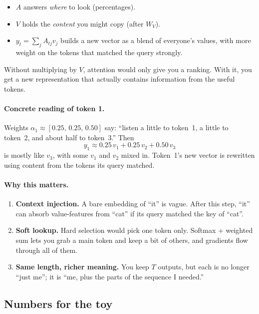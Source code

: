\documentclass[11pt]{article}
\begin{document}
\begin{itemize}[leftmargin=*]
  \item \(A\) answers \emph{where} to look (percentages).
  \item \(V\) holds the \emph{content} you might copy (after \(W_V\)).
  \item \(y_t = \sum_j A_{tj} v_j\) builds a new vector as a blend of
        everyone's values, with more weight on the tokens that matched
        the query strongly.
\end{itemize}

Without multiplying by \(V\), attention would only give you a ranking.
With it, you get a new representation that actually contains information
from the useful tokens.

\paragraph{Concrete reading of token 1.}
Weights \(\alpha_1 \approx [0.25,\,0.25,\,0.50]\) say:
``listen a little to token~1, a little to token~2, and about half to token~3.''
Then
\[
  y_1 \approx 0.25\,v_1 + 0.25\,v_2 + 0.50\,v_3
\]
is mostly like \(v_3\), with some \(v_1\) and \(v_2\) mixed in.
Token~1's new vector is rewritten using content from the tokens its query matched.

\paragraph{Why this matters.}
\begin{enumerate}[leftmargin=*]
  \item \textbf{Context injection.}
        A bare embedding of ``it'' is vague. After this step, ``it'' can absorb
        value-features from ``cat'' if its query matched the key of ``cat''.
  \item \textbf{Soft lookup.}
        Hard selection would pick one token only. Softmax + weighted sum lets
        you grab a main token and keep a bit of others, and gradients flow
        through all of them.
  \item \textbf{Same length, richer meaning.}
        You keep \(T\) outputs, but each is no longer ``just me''; it is
        ``me, plus the parts of the sequence I needed.''
\end{enumerate}

\subsection{Numbers for the toy}
\end{document}
